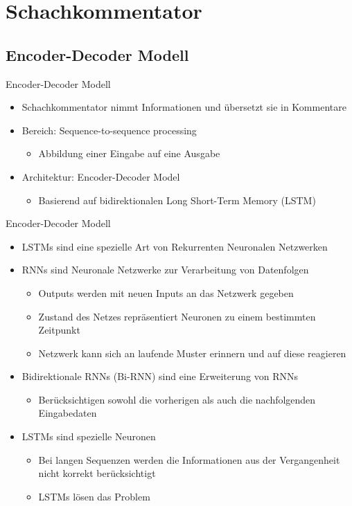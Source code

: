 \section{Schachkommentator}

\subsection{Encoder-Decoder Modell}

\begin{frame}{Encoder-Decoder Modell}
\begin{itemize}
	\item Schachkommentator nimmt Informationen und übersetzt sie in Kommentare
	\item Bereich: Sequence-to-sequence processing
	\begin{itemize}
		\item Abbildung einer Eingabe auf eine Ausgabe
	\end{itemize}
	\item Architektur: Encoder-Decoder Model
	\begin{itemize}
		\item Basierend auf bidirektionalen Long Short-Term Memory (LSTM)
	\end{itemize}
\end{itemize}
\end{frame}




\begin{frame}{Encoder-Decoder Modell}
\begin{itemize}
	\item LSTMs sind eine spezielle Art von Rekurrenten Neuronalen Netzwerken
	\item RNNs sind Neuronale Netzwerke zur Verarbeitung von Datenfolgen
	\begin{itemize}
		\item Outputs werden mit neuen Inputs an das Netzwerk gegeben
		\item Zustand des Netzes repräsentiert Neuronen zu einem bestimmten Zeitpunkt
		\item Netzwerk kann sich an laufende Muster erinnern und auf diese reagieren
	\end{itemize}
	\item Bidirektionale RNNs (Bi-RNN) sind eine Erweiterung von RNNs
	\begin{itemize}
		\item Berücksichtigen sowohl die vorherigen als auch die nachfolgenden Eingabedaten
	\end{itemize}
	\item LSTMs sind spezielle Neuronen
	\begin{itemize}
		\item Bei langen Sequenzen werden die Informationen aus der Vergangenheit nicht korrekt berücksichtigt
		\item LSTMs lösen das Problem
	\end{itemize}
\end{itemize}
\end{frame}




